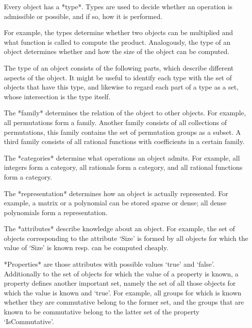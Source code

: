 

Every {\GAP} object has a *type*.
Types are used to decide whether an operation is admissible or possible,
and if so, how it is performed.

For example, the types determine whether two objects can be multiplied
and what function is called to compute the product.
Analogously, the type of an object determines whether and how the size
of the object can be computed.

The type of an object consists of the following parts,
which describe different aspects of the object.
It might be useful to identify each type with the set of objects that
have this type, and likewise to regard each part of a type as a set,
whose intersection is the type itself.

The *family* determines the relation of the object to other objects.
For example, all permutations form a family.
Another family consists of all collections of permutations,
this family contains the set of permutation groups as a subset.
A third family consists of all rational functions with coefficients
in a certain family.

The *categories* determine what operations an object admits.
For example, all integers form a category, all rationals form a category,
and all rational functions form a category.

The *representation* determines how an object is actually represented.
For example, a matrix or a polynomial can be stored sparse or dense;
all dense polynomials form a representation.

The *attributes* describe knowledge about an object.
For example, the set of objects corresponding to the attribute `Size'
is formed by all objects for which the value of `Size' is known resp.
can be computed cheaply.

*Properties* are those attributes with possible values `true' and
`false'.
Additionally to the set of objects for which the value of a property is
known, a property defines another important set,
namely the set of all those objects for which the value is known and
`true'.
For example, all groups for which is known whether they are commutative
belong to the former set, and the groups that are known to be commutative
belong to the latter set of the property `IsCommutative'.

